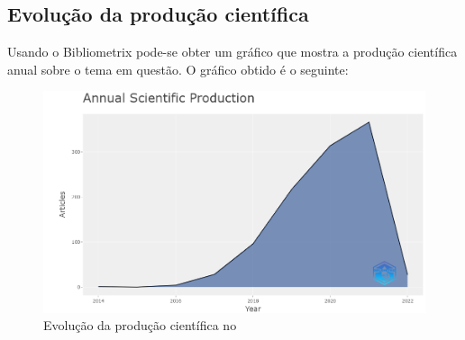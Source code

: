 \subsection{Evolução da produção científica}

Usando o Bibliometrix pode-se obter um gráfico que mostra a produção científica anual sobre o tema em questão. O gráfico obtido é o seguinte:


\begin{figure}[H]
    \centering
    \includegraphics[width=1\textwidth]{experiments/brunoedcf/AnaliseBibliometrica/BlockchainInHealth/Figures/AnualCientProd.png}
    \caption{Evolução da produção científica no \dataset}
\end{figure}